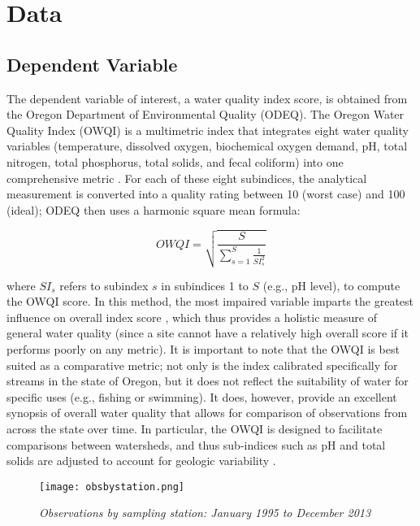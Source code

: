 \documentclass[11pt,a4paper,titlepage]{article}
\begin{document}
\section*{Data}

\subsection*{Dependent Variable}
The dependent variable of interest, a water quality index score, is obtained from the Oregon Department of Environmental Quality (ODEQ). The Oregon Water Quality Index (OWQI) is a multimetric index that integrates eight water quality variables (temperature, dissolved oxygen, biochemical oxygen demand, pH, total nitrogen, total phosphorus, total solids, and fecal coliform) into one comprehensive metric \parencite{cude2001}. For each of these eight subindices, the analytical measurement is converted into a quality rating between 10 (worst case) and 100 (ideal); ODEQ then uses a harmonic square mean formula:

\begin{equation}
OWQI = \sqrt{\frac{S}{\sum_{s=1}^{S}\frac{1}{SI^{2}_{s}}}}
\label{eq:owqi}
\end{equation}

\noindent
where $SI_s$ refers to subindex $s$ in subindices 1 to $S$ (e.g., pH level), to compute the OWQI score. In this method, the most impaired variable imparts the greatest influence on overall index score \parencite{cude2001}, which thus provides a holistic measure of general water quality (since a site cannot have a relatively high overall score if it performs poorly on any metric). It is important to note that the OWQI is best suited as a comparative metric; not only is the index calibrated specifically for streams in the state of Oregon, but it does not reflect the suitability of water for specific uses (e.g., fishing or swimming).  It does, however, provide an excellent synopsis of overall water quality that allows for comparison of observations from across the state over time. In particular, the OWQI is designed to facilitate comparisons between watersheds, and thus sub-indices such as pH and total solids are adjusted to account for geologic variability \parencite{cude2001}.

\begin{figure}[!htbp]
\label{fig:dataplot}
\graphicspath{ {`/Users/TScott/Google\space Drive/quinalt/APPAM_2014/'}}
\centering
\texttt{[image: obsbystation.png]}
\caption{\textit{Observations by sampling station: January 1995 to December 2013}}
\end{figure}
\end{document}
